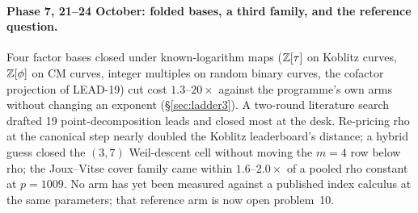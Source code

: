 \paragraph{Phase 7, 21--24 October: folded bases, a third family, and the
reference question.} Four factor bases closed under known-logarithm maps
($\mathbb{Z}[\tau]$ on Koblitz curves, $\mathbb{Z}[\phi]$ on CM curves, integer multiples
on random binary curves, the cofactor projection of LEAD-19) cut cost
$1.3$--$20\times$ against the programme's own arms without changing an
exponent (\S\ref{sec:ladder3}). A two-round literature search drafted 19
point-decomposition leads and closed most at the desk. Re-pricing rho at the
canonical step nearly doubled the Koblitz leaderboard's distance; a hybrid
guess closed the $(3,7)$ Weil-descent cell without moving the $m=4$ row
below rho; the Joux--Vitse cover family came within $1.6$--$2.0\times$ of a
pooled rho constant at $p=1009$. No arm has yet been measured against a
published index calculus at the same parameters; that reference arm is now
open problem~10.
